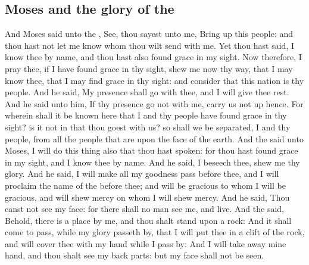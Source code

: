 \begin{biblechapter}
\section*{Moses and the glory of the \LORD}
\verse And Moses said unto the \LORD, See, thou sayest unto me, Bring up this people: and thou hast not let me know whom thou wilt send with me. Yet thou hast said, I know thee by name, and thou hast also found grace in my sight.
\verse Now therefore, I pray thee, if I have found grace in thy sight, shew me now thy way, that I may know thee, that I may find grace in thy sight: and consider that this nation is thy people.
\verse And he said, My presence shall go with thee, and I will give thee rest.
\verse And he said unto him, If thy presence go not with me, carry us not up hence.
\verse For wherein shall it be known here that I and thy people have found grace in thy sight? is it not in that thou goest with us? so shall we be separated, I and thy people, from all the people that are upon the face of the earth.
\verse And the \LORD said unto Moses, I will do this thing also that thou hast spoken: for thou hast found grace in my sight, and I know thee by name.
\verse And he said, I beseech thee, shew me thy glory.
\verse And he said, I will make all my goodness pass before thee, and I will proclaim the name of the \LORD before thee; and will be gracious to whom I will be gracious, and will shew mercy on whom I will shew mercy.
\verse And he said, Thou canst not see my face: for there shall no man see me, and live.
\verse And the \LORD said, Behold, there is a place by me, and thou shalt stand upon a rock:
\verse And it shall come to pass, while my glory passeth by, that I will put thee in a clift of the rock, and will cover thee with my hand while I pass by:
\verse And I will take away mine hand, and thou shalt see my back parts: but my face shall not be seen.
\end{biblechapter}

